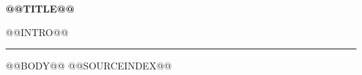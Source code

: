 \documentclass[11pt,a4paper]{article}
\begin{document}
{\LARGE\bfseries\color{ink}@@TITLE@@\par}
\smallskip
@@INTRO@@
\medskip\hrule\medskip
@@BODY@@
@@SOURCEINDEX@@
\end{document}
